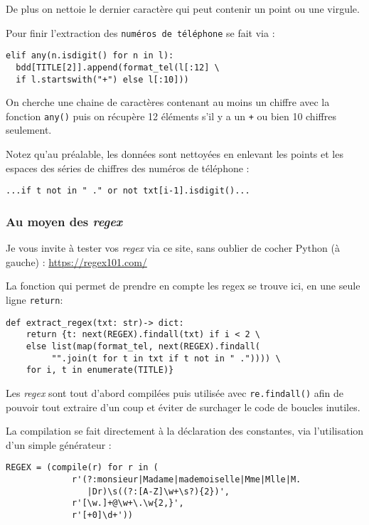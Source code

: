 \documentclass[a4paper,12pt]{article}
\begin{document}
De plus on nettoie le dernier caractère qui peut contenir un point ou une virgule.
\medskip

Pour finir l'extraction des \texttt{numéros de téléphone} se fait via :
\begin{lstlisting}
elif any(n.isdigit() for n in l):
  bdd[TITLE[2]].append(format_tel(l[:12] \
  if l.startswith("+") else l[:10]))
\end{lstlisting}
\medskip

On cherche une chaine de caractères contenant au moins un chiffre avec la fonction \texttt{any()} puis on récupère 12 éléments s'il y a un \og \texttt{+}\fg{} ou bien 10 chiffres seulement.
\medskip

Notez qu'au préalable, les données sont nettoyées en enlevant les points et les espaces des séries de chiffres des numéros de téléphone :
\begin{verbatim}
...if t not in " ." or not txt[i-1].isdigit()...
\end{verbatim}
\medskip

\subsubsection*{Au moyen des \textit{regex}}
Je vous invite à tester vos \textit{regex} via ce site, sans oublier de cocher Python (à gauche) : \url{https://regex101.com/}
\medskip

La fonction qui permet de prendre en compte les regex se trouve ici, en une seule ligne \texttt{return}:
\begin{lstlisting}
def extract_regex(txt: str)-> dict:
    return {t: next(REGEX).findall(txt) if i < 2 \
    else list(map(format_tel, next(REGEX).findall(
    	 "".join(t for t in txt if t not in " .")))) \
    for i, t in enumerate(TITLE)}
\end{lstlisting}
\medskip

Les \textit{regex} sont tout d'abord compilées puis utilisée avec \texttt{re.findall()} afin de pouvoir tout extraire d'un coup et éviter de surchager le code de boucles inutiles.
\medskip

La compilation se fait directement à la déclaration des constantes, via l'utilisation d'un simple générateur :
\begin{lstlisting}
REGEX = (compile(r) for r in (
             r'(?:monsieur|Madame|mademoiselle|Mme|Mlle|M.
             	|Dr)\s((?:[A-Z]\w+\s?){2})',
             r'[\w.]+@\w+\.\w{2,}',
             r'[+0]\d+'))
\end{lstlisting}
\medskip
\end{document}
